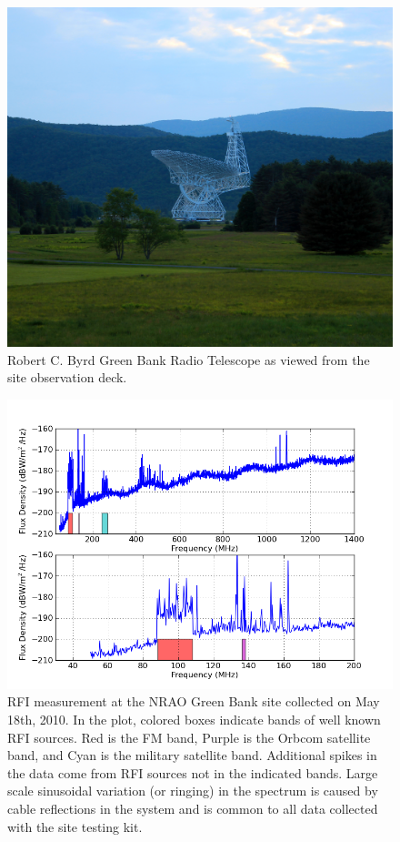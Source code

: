 \begin{figure}[htb]
\begin{minipage}[b]{0.47\textwidth}
\includegraphics[width=0.95\linewidth]{RFI_testing/figures/gbt_site.jpg}
\caption{Robert C. Byrd Green Bank Radio Telescope as viewed from the site observation deck. }
\label{Fig:gbt}
\end{minipage}
\end{figure}

\begin{figure}[htb]
\begin{center}
\includegraphics[width=0.9\linewidth]{RFI_testing/figures/GBT_bands.png}
\caption{RFI measurement at the NRAO Green Bank site collected on May 18th, 2010. In the plot, colored boxes indicate bands of well known RFI sources. Red is the FM band, Purple is the Orbcom satellite band, and Cyan is the military satellite band. Additional spikes in the data come from RFI sources not in the indicated bands. Large scale sinusoidal variation (or ringing) in the spectrum is caused by cable reflections in the system and is common to all data collected with the site testing kit. }
\label{Fig:gbtrfi}
\end{center}
\end{figure}


